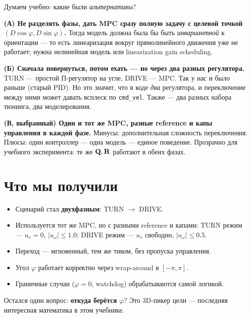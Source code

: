\begin{ideabox}
Думаем учебно: какие были \emph{альтернативы}?

\textbf{(А) Не разделять фазы, дать MPC сразу полную задачу с целевой
точкой $(D\cos\varphi, D\sin\varphi)$.} Тогда модель должна была бы
быть \emph{инвариантной} к ориентации --- то есть линеаризация вокруг
прямолинейного движения уже не работает; нужна нелинейная модель или
linearization gain scheduling.

\textbf{(Б) Сначала повернуться, потом ехать --- но через два разных
регулятора.} TURN --- простой П-регулятор на угле, DRIVE --- MPC.
Так у нас и было раньше (старый PID). Но это значит, что в коде
\emph{два} регулятора, и переключение между ними может давать всплеск
по \texttt{cmd\_vel}. Также --- два разных набора тюнинга, два моделирования.

\textbf{(В, выбранный) Один и тот же MPC, разные reference и капы
управления в каждой фазе.} Минусы: дополнительная сложность
переключения. Плюсы: один контроллер --- одна модель --- единое поведение.
Прозрачно для учебного эксперимента: те же $\mathbf{Q}, \mathbf{R}$ работают
в обеих фазах.
\end{ideabox}

\section{Что мы получили}

\begin{itemize}
  \item Сценарий стал \textbf{двухфазным}: TURN $\to$ DRIVE.
  \item Используется тот же MPC, но с разными reference и капами:
        TURN режим --- $u_v = 0$, $|u_\omega| \le 1.0$;
        DRIVE режим --- $u_v$ свободно, $|u_\omega| \le 0.5$.
  \item Переход --- мгновенный, тем же тиком, без пропуска
        управления.
  \item Угол $\varphi$ работает корректно через wrap-around в $[-\pi, \pi]$.
  \item Граничные случаи ($\varphi = 0$, watchdog) обрабатываются
        самой логикой.
\end{itemize}

Остался один вопрос: \textbf{откуда берётся $\varphi$}? Это
3D-пикер цели --- последняя интересная математика в этом учебнике.
